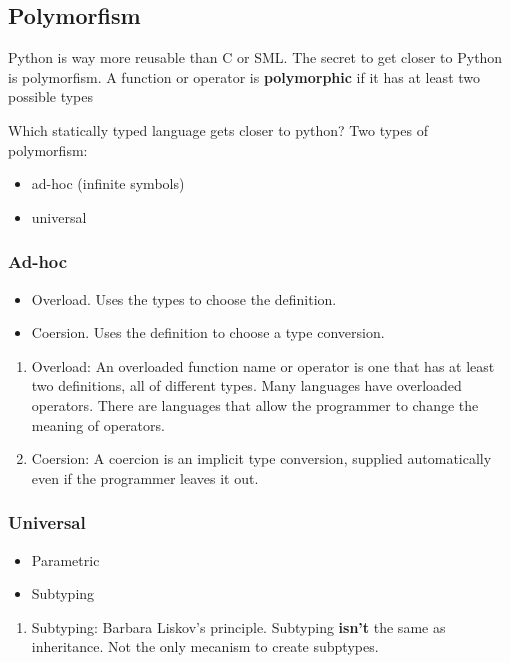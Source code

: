 \documentclass[11pt]{article}
\begin{document}
\subsection{Polymorfism}
\label{sec:org6535ad1}
Python is way more reusable than C or SML. The secret to get closer to Python is
polymorfism. A function or operator is \textbf{polymorphic} if it has at least two possible
types

Which statically typed language gets closer to python? Two types of polymorfism:
\begin{itemize}
\item ad-hoc (infinite symbols)
\item universal
\end{itemize}

\subsubsection{Ad-hoc}
\label{sec:org7805028}
\begin{itemize}
\item Overload. Uses the types to choose the definition.
\item Coersion. Uses the definition to choose a type conversion.
\end{itemize}

\begin{enumerate}
\item Overload:
\label{sec:orgfd4079a}
An overloaded function name or operator is one that has at least two definitions, all
of different types. Many languages have overloaded operators. There are languages
that allow the programmer to change the meaning of operators.

\item Coersion:
\label{sec:org3ed6314}
A coercion is an implicit type conversion, supplied automatically even if the
programmer leaves it out.
\end{enumerate}
\subsubsection{Universal}
\label{sec:org759f954}
\begin{itemize}
\item Parametric
\item Subtyping
\end{itemize}

\begin{enumerate}
\item Subtyping:
\label{sec:org5b1da42}
Barbara Liskov's principle. Subtyping \textbf{isn't} the same as inheritance. Not the only
mecanism to create subptypes.
\end{enumerate}
\end{document}
